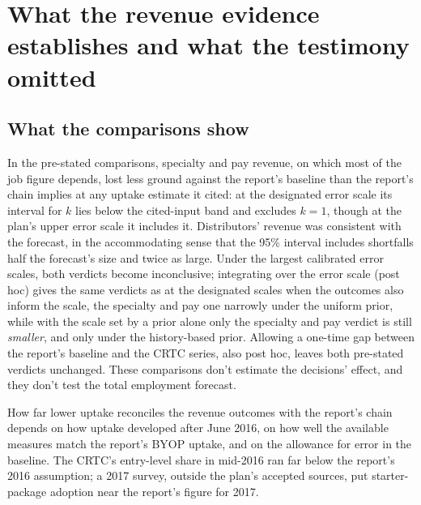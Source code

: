 
\section{What the revenue evidence establishes and what the testimony omitted}
\label{sec:discussion}

\subsection{What the comparisons show}

In the pre-stated comparisons, specialty and pay revenue, on which most of the job figure depends, lost less ground against the report's baseline than the report's chain implies at any uptake estimate it cited: at the designated error scale its interval for \(k\) lies below the cited-input band and excludes \(k=1\), though at the plan's upper error scale it includes it. Distributors' revenue was consistent with the forecast, in the accommodating sense that the 95\% interval includes shortfalls half the forecast's size and twice as large. Under the largest calibrated error scales, both verdicts become inconclusive; integrating over the error scale (post hoc) gives the same verdicts as at the designated scales when the outcomes also inform the scale, the specialty and pay one narrowly under the uniform prior, while with the scale set by a prior alone only the specialty and pay verdict is still \emph{smaller}, and only under the history-based prior. Allowing a one-time gap between the report's baseline and the CRTC series, also post hoc, leaves both pre-stated verdicts unchanged. These comparisons don't estimate the decisions' effect, and they don't test the total employment forecast.

How far lower uptake reconciles the revenue outcomes with the report's chain depends on how uptake developed after June 2016, on how well the available measures match the report's BYOP uptake, and on the allowance for error in the baseline. The CRTC's entry-level share in mid-2016 ran far below the report's 2016 assumption; a 2017 survey, outside the plan's accepted sources, put starter-package adoption near the report's figure for 2017.

